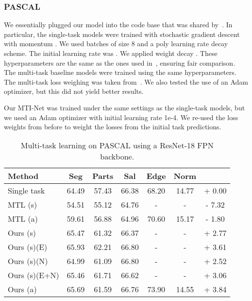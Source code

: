 \documentclass[runningheads]{llncs}
\begin{document}
\subsubsection{PASCAL}
We essentially plugged our model into the code base that was shared by~\cite{maninis2019attentive}. In particular, the single-task models were trained with stochastic gradient descent with momentum . We used batches of size 8 and a poly learning rate decay scheme. The initial learning rate was . We applied weight decay . These hyperparameters are the same as the ones used in~\cite{maninis2019attentive}, ensuring fair comparison. The multi-task baseline models were trained using the same hyperparameters. The multi-task loss weighing was taken from~\cite{maninis2019attentive}. We also tested the use of an Adam optimizer, but this did not yield better results. 

Our MTI-Net was trained under the same settings as the single-task models, but we used an Adam optimizer with initial learning rate 1e-4. We re-used the loss weights from before to weight the losses from the initial task predictions.  


\begin{table}[t]
    \caption{Multi-task learning on PASCAL using a ResNet-18 FPN backbone.}
    \centering
    \label{tab: pascal_resnet18}
    \scriptsize{
    \begin{tabular}{|l|c|c|c|c|c|c|}
    \hline
    Method & Seg  & Parts  & Sal  & Edge  & Norm  &  \\
    \hline
    Single task & 64.49 & 57.43 & 66.38 & 68.20 & 14.77 & + 0.00 \\
    MTL (s) & 54.51 & 55.12 & 64.76 & - & - & - 7.32 \\
    MTL (a) & 59.61 & 56.88 & 64.96 & 70.60 & 15.17 & - 1.80 \\
    \hline
    Ours (s) & 65.47 & 61.32 & 66.37 & - & - & + 2.77 \\
    Ours (s)(E) & 65.93 & 62.21 & 66.80 & - & - & + 3.61 \\
    Ours (s)(N) & 64.99 & 61.09 & 66.80 & - & - & + 2.52 \\
    Ours (s)(E+N) & 65.46 & 61.71 & 66.62 & - & - & + 3.06 \\
    Ours (a) & 65.69 & 61.59 & 66.76 & 73.90 & 14.55 & + 3.84 \\
    \hline
    \end{tabular}}
  \end{table}
\end{document}
